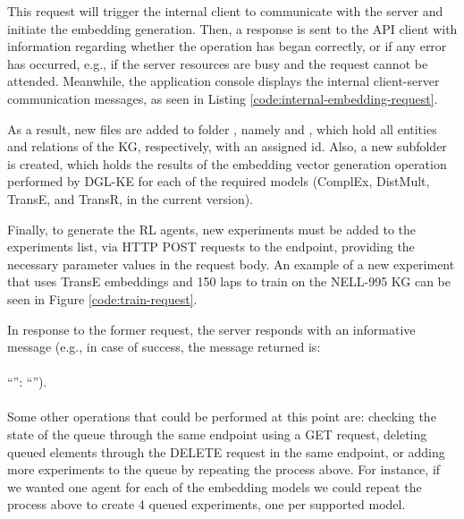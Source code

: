 

This request will trigger the internal client to communicate with the server and initiate the embedding generation. Then, a response is sent to the API client with information regarding whether the operation has began correctly, or if any error has occurred, e.g., if the server resources are busy and the request cannot be attended. 
Meanwhile, the application console displays the internal client-server communication messages, as seen in Listing \ref{code:internal-embedding-request}.



As a result, new files are added to folder , namely  and , which hold all entities and relations of the KG, respectively, with an assigned id. Also, a new  subfolder is created, which holds the results of the embedding vector generation operation performed by DGL-KE for each of the required models (ComplEx, 
 DistMult, TransE, and TransR,  in the current version).

Finally, to generate the RL agents, new experiments must be added to the experiments list, via HTTP POST requests to the  endpoint, providing the necessary parameter values in the request body. An example of a new experiment that uses TransE embeddings and 150 laps to train on the  NELL-995 KG can be seen in Figure \ref{code:train-request}.



In response to the former request, the server responds with an informative message (e.g., in case of success, the message returned is:
\\
\\
``'': ``'').
\\
\\
Some other operations that could be performed at this point are: checking the state of the queue through the same  endpoint using a GET request, deleting queued elements through the DELETE request in the same endpoint, or adding more experiments to the queue by repeating the process above. For instance, if we wanted one agent for each of the embedding models we could repeat the process above to create 4 queued experiments, one per supported model.

